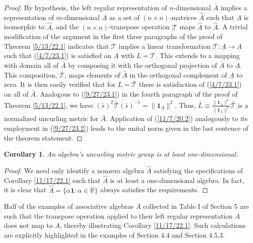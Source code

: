 \documentclass{amsart}
\numberwithin{equation}{section}
\newtheorem{corollary}[theorem]{Corollary}
\theoremstyle{definition}
\numberwithin{theorem}{section}
\begin{document}
 \begin{proof}  By hypothesis, the left regular representation of $n$-dimensional $\bar{A}$ implies a representation of $m$-dimensional $\underline{A}$ as a set of $(n\times n)$-matrices $\hat{A}$ such that $\underline{A}$ is isomorphic to $\hat{A}$, and the $(n\times n)$-transpose operation $\mathcal{T}$ maps $\hat{A}$ to $\hat{A}$.  A trivial modification of the argument in the first three paragraphs of the proof of Theorem \ref{5/13/22.1} indicates that $\mathcal{T}$ implies a linear transformation $\underline{\mathcal{T}}:\underline{A}\rightarrow\underline{A}$ such that (\ref{4/7/23.1}) is satisfied on $\underline{A}$ with $L=\underline{\mathcal{T}}$.  This extends to a mapping with domain all of $\bar{A}$ by composing it with the orthogonal projection of $\bar{A}$ to $\underline{A}$. This composition, $\bar{\mathcal{T}}$, maps elements of $\bar{A}$ in the orthogonal complement of $\underline{A}$ to zero.  It is then easily verified that for $L=\bar{\mathcal{T}}$ there is satisfaction of (\ref{4/7/23.1}) on all of $\bar{A}$. Analogous to (\ref{9/27/23.1}) in the fourth paragraph of the proof of Theorem \ref{5/13/22.1}, we have $(\bar{s})^T\bar{\mathcal{T}}(\bar{s})^{-1} = \|\mathbf{1}_{\underline{A}} \|^2$. Thus, $\bar{L}\equiv \frac{\|\mathbf{1}_{\bar{A}}\|^2}{\|\mathbf{1}_{\underline{A}}\|^2}\bar{\mathcal{T}}$ is a normalized uncurling metric for $\bar{
 A}$. Application of (\ref{11/7/20.2}) analogously to its employment in (\ref{9/27/23.2}) leads to the unital norm given in the last sentence of the theorem statement.
 \end{proof}
 
 
 \begin{corollary}\label{1/1/23.1} An algebra's uncurling metric group is at least one-dimensional. \end{corollary}
 
 \begin{proof} We need only identify a nonzero algebra $\hat{A}$ satisfying the specifications of Corollary \ref{11/17/22.1} such that $\hat{A}$ is at least a one-dimensional algebra.  In fact, it is clear that $\hat{A} = \{\alpha\mathbf{1}:\alpha\in\mathbb{R}\}$ always satisfies the requirements.
 \end{proof}

 
Half of the examples of associative algebras $\bar{A}$ collected in Table I of Section 5 are such that the transpose operation applied to their left regular representation $A$ does not map to $A$, thereby illustrating Corollary \ref{11/17/22.1}.  Such calculations are explicitly highlighted in the examples of Section 4.4 and Section 4.5.3.
\end{document}
